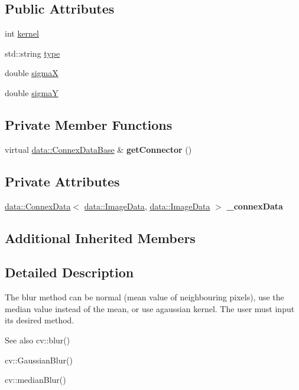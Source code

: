 \subsection*{Public Attributes}
\begin{DoxyCompactItemize}
\item 
int \hyperlink{classfilter_1_1algos_1_1_blur_aac3d6d8af63e5ad496fde537dc3d55aa}{kernel}
\item 
std\+::string \hyperlink{classfilter_1_1algos_1_1_blur_ac678a666d1d708d882222b198e9d9b10}{type}
\item 
double \hyperlink{classfilter_1_1algos_1_1_blur_a3b511f5fb439b9424c18141efd94b0c1}{sigmaX}
\item 
double \hyperlink{classfilter_1_1algos_1_1_blur_ac41e02492b5ab6ac6578176b11f013fc}{sigmaY}
\end{DoxyCompactItemize}
\subsection*{Private Member Functions}
\begin{DoxyCompactItemize}
\item 
\mbox{\label{classfilter_1_1algos_1_1_blur_ae5174fbd08339457707b568a76618f2d}} 
virtual \hyperlink{classfilter_1_1data_1_1_connex_data_base}{data\+::\+Connex\+Data\+Base} \& {\bfseries get\+Connector} ()
\end{DoxyCompactItemize}
\subsection*{Private Attributes}
\begin{DoxyCompactItemize}
\item 
\mbox{\label{classfilter_1_1algos_1_1_blur_a5e14f95de0ecd4b9c2d7c5bb82153cc0}} 
\hyperlink{classfilter_1_1data_1_1_connex_data}{data\+::\+Connex\+Data}$<$ \hyperlink{classfilter_1_1data_1_1_image_data}{data\+::\+Image\+Data}, \hyperlink{classfilter_1_1data_1_1_image_data}{data\+::\+Image\+Data} $>$ {\bfseries \+\_\+connex\+Data}
\end{DoxyCompactItemize}
\subsection*{Additional Inherited Members}


\subsection{Detailed Description}
The blur method can be normal (mean value of neighbouring pixels), use the median value instead of the mean, or use agaussian kernel. The user must input its desired method. \begin{DoxySeeAlso}{See also}
cv\+::blur() 

cv\+::\+Gaussian\+Blur() 

cv\+::median\+Blur() 
\end{DoxySeeAlso}


